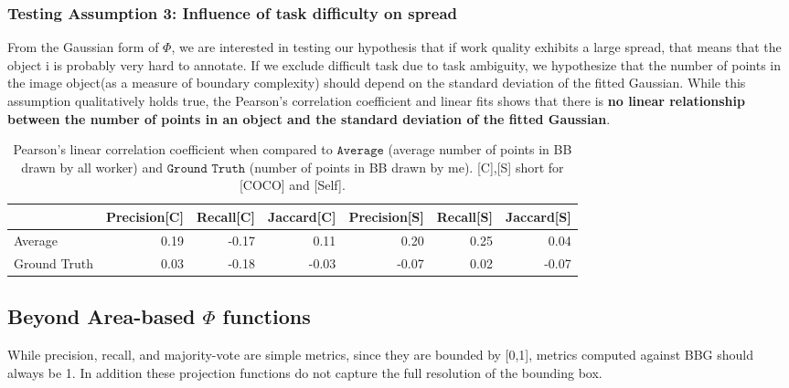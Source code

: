 \documentclass[12pt]{article}
\begin{document}
\subsubsection{Testing Assumption 3: Influence of task difficulty on spread}
\par From the Gaussian form of $\Phi$, we are interested in testing our hypothesis that if work quality exhibits a large spread, that means that the object i is probably very hard to annotate. If we exclude difficult task due to task ambiguity, we hypothesize that the number of points in the image object(as a measure of boundary complexity) should depend on the standard deviation of the fitted Gaussian. While this assumption qualitatively holds true, the Pearson's correlation coefficient and linear fits shows that there is \textbf{no linear relationship between the number of points in an object and the standard deviation of the fitted Gaussian}.

\begin{table}[h]
\centering
\begin{tabular}{lrrrrrr}
\hline
                              &   Precision[C] &   Recall[C] &   Jaccard[C] &   Precision[S] &   Recall[S] &   Jaccard[S] \\
\hline
 Average             &   0.19 &  -0.17 &   0.11 &   0.20 &   0.25 &   0.04 \\
Ground Truth &   0.03 &  -0.18 &  -0.03 &  -0.07 &   0.02 &  -0.07 \\
\hline
\end{tabular}
\caption{Pearson's linear correlation coefficient when compared to $\texttt{Average}$ (average number of points in BB drawn by all worker) and  $\texttt{Ground Truth}$ (number of points in BB drawn by me). [C],[S] short for [COCO] and [Self].}
\end{table}
\subsection{Beyond Area-based $\Phi$ functions}
\par While precision, recall, and majority-vote are simple metrics, since they are bounded by [0,1], metrics computed against BBG should always be 1. In addition these projection functions do not capture the full resolution of the bounding box.  
\end{document}
